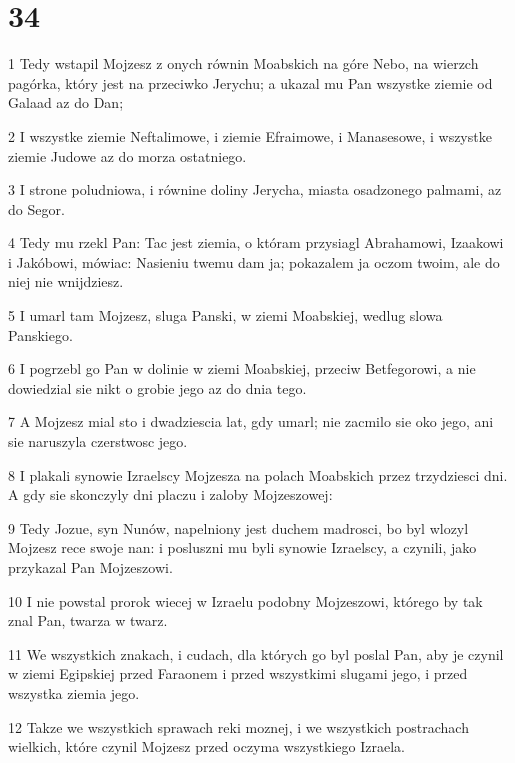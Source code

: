 \chapter{34}

\par 1 Tedy wstapil Mojzesz z onych równin Moabskich na góre Nebo, na wierzch pagórka, który jest na przeciwko Jerychu; a ukazal mu Pan wszystke ziemie od Galaad az do Dan;
\par 2 I wszystke ziemie Neftalimowe, i ziemie Efraimowe, i Manasesowe, i wszystke ziemie Judowe az do morza ostatniego.
\par 3 I strone poludniowa, i równine doliny Jerycha, miasta osadzonego palmami, az do Segor.
\par 4 Tedy mu rzekl Pan: Tac jest ziemia, o któram przysiagl Abrahamowi, Izaakowi i Jakóbowi, mówiac: Nasieniu twemu dam ja; pokazalem ja oczom twoim, ale do niej nie wnijdziesz.
\par 5 I umarl tam Mojzesz, sluga Panski, w ziemi Moabskiej, wedlug slowa Panskiego.
\par 6 I pogrzebl go Pan w dolinie w ziemi Moabskiej, przeciw Betfegorowi, a nie dowiedzial sie nikt o grobie jego az do dnia tego.
\par 7 A Mojzesz mial sto i dwadziescia lat, gdy umarl; nie zacmilo sie oko jego, ani sie naruszyla czerstwosc jego.
\par 8 I plakali synowie Izraelscy Mojzesza na polach Moabskich przez trzydziesci dni. A gdy sie skonczyly dni placzu i zaloby Mojzeszowej:
\par 9 Tedy Jozue, syn Nunów, napelniony jest duchem madrosci, bo byl wlozyl Mojzesz rece swoje nan: i posluszni mu byli synowie Izraelscy, a czynili, jako przykazal Pan Mojzeszowi.
\par 10 I nie powstal prorok wiecej w Izraelu podobny Mojzeszowi, którego by tak znal Pan, twarza w twarz.
\par 11 We wszystkich znakach, i cudach, dla których go byl poslal Pan, aby je czynil w ziemi Egipskiej przed Faraonem i przed wszystkimi slugami jego, i przed wszystka ziemia jego.
\par 12 Takze we wszystkich sprawach reki moznej, i we wszystkich postrachach wielkich, które czynil Mojzesz przed oczyma wszystkiego Izraela.


